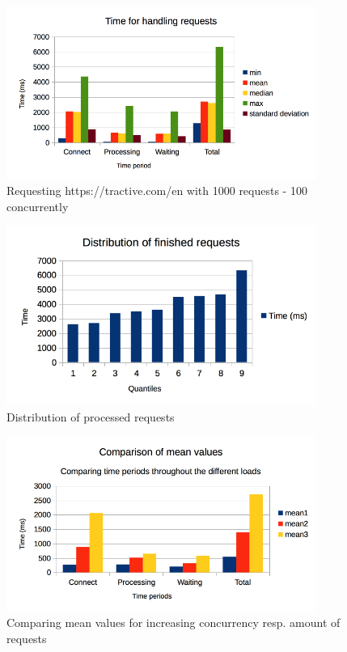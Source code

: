 \begin{figure}[h]
	\centering
		\includegraphics[width=0.9\textwidth]{imgs/con_req100.png}
	\caption{Requesting https://tractive.com/en with 1000 requests - 100 concurrently}
\end{figure}

\begin{figure}[h]
	\centering
		\includegraphics[width=0.9\textwidth]{imgs/dist_con100.png}
	\caption{Distribution of processed requests}
\end{figure}

\begin{figure}[h]
	\centering
		\includegraphics[width=0.9\textwidth]{imgs/comparison_mean_values.png}
	\caption{Comparing mean values for increasing concurrency resp. amount of requests}
\end{figure}

